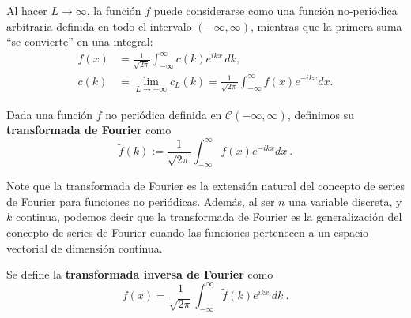Al hacer $L \to \infty$, la función $f$ puede considerarse como una función no-periódica arbitraria definida en todo el intervalo $(-\infty, \infty)$, mientras que la primera suma ``se convierte'' en una integral:
\begin{align*}
    f(x)& = \frac{1}{\sqrt{2\pi}} \int_{-\infty}^{\infty} c(k) e^{ikx} \,dk, \\
  c(k) & = \lim_{L\to + \infty} c_L(k) = \frac{1}{\sqrt{2\pi}} \int_{-\infty}^{\infty} f(x) e^{-ikx} dx.
\end{align*}

\begin{defi} 
    Dada una función $f$ no periódica definida en $\mathscr{C}(-\infty, \infty)$, definimos su \textbf{transformada de Fourier} como 
    \begin{equation}\label{T.Fourier}
        \boxed{\tilde{f}(k) := \frac{1}{\sqrt{2\pi}} \int_{-\infty}^{\infty} f(x) e^{-ikx} dx \ .} 
    \end{equation}  
\end{defi}

Note que la transformada de Fourier es la extensión natural del concepto de series de Fourier para funciones no periódicas. Además, al ser $n$ una variable discreta, y $k$ continua, podemos decir que la transformada de Fourier es la generalización del concepto de series de Fourier cuando las funciones pertenecen a un espacio vectorial de dimensión continua.

\begin{defi}
    Se define la \textbf{transformada inversa de Fourier} como
      \begin{equation}\label{I.Fourier}
     \boxed{f(x) = \frac{1}{\sqrt{2\pi}} \int_{-\infty}^{\infty} \tilde{f}(k) e^{ikx} \,dk \ .} 
    \end{equation}  
\end{defi}

